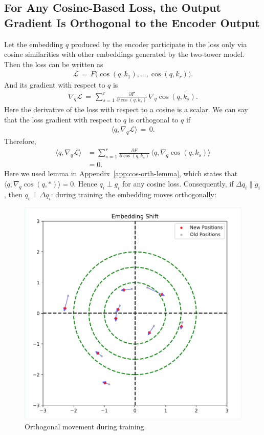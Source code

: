 \subsection{For Any Cosine-Based Loss, the Output Gradient Is Orthogonal to the Encoder Output}

Let the embedding $q$ produced by the encoder participate in the loss only via cosine similarities with other embeddings generated by the two-tower model. Then the loss can be written as
\begin{align}
\mathcal L \,=\, F\bigl(\cos(q,k_1),\dots,\cos(q,k_r)\bigr).
\end{align}
And its gradient with respect to $q$ is
\begin{align}
\nabla_q\mathcal L \,=\, \sum_{s=1}^{r} \frac{\partial F}{\partial \cos(q,k_s)}\, \nabla_q \cos(q,k_s). \label{eq:grad-cos-loss}
\end{align}
Here the derivative of the loss with respect to a cosine is a scalar. We can say that the loss gradient with respect to $q$ is orthogonal to $q$ if
\begin{align}
\langle q,\nabla_q\mathcal L \rangle \,=\, 0.
\end{align}
Therefore,
\begin{equation}
\begin{aligned}
\langle q,\nabla_q\mathcal L \rangle 
&= \sum_{s=1}^{r} \frac{\partial F}{\partial \cos(q,k_s)}\, \langle q,\nabla_q \cos(q,k_s) \rangle \\
&= 0.
\end{aligned}
\end{equation}
Here we used lemma in Appendix~\ref{app:cos-orth-lemma}, which states that $\langle q, \nabla_q \cos(q,\ast) \rangle = 0$.
Hence $q_i \perp g_i$ for any cosine loss. Consequently, if $\Delta q_i \parallel g_i$, then $q_i \perp \Delta q_i$: during training the embedding moves orthogonally:

\begin{figure}[!htbp]
\centering
\includegraphics[width=.95\columnwidth]{../draft_materials/figure_2_paper.pdf}
\caption{Orthogonal movement during training.}
\label{fig:cos-orth}
\end{figure}

